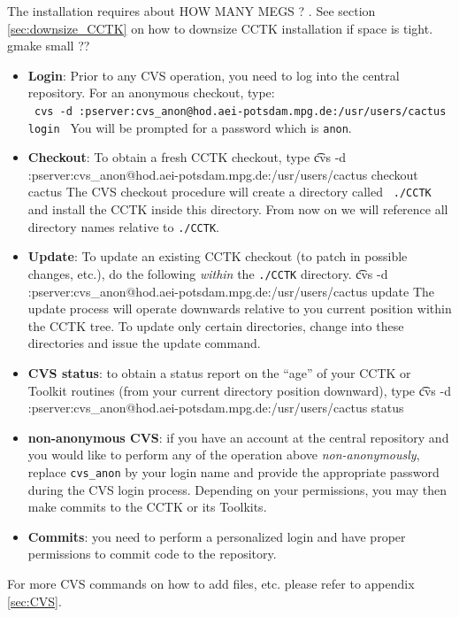 The installation requires about {\q HOW MANY MEGS ? }. See section
\ref{sec:downsize_CCTK} on how to downsize CCTK installation if space is tight.
{\q gmake small ??}

\begin{itemize}
\item{\bf Login}: Prior to any CVS operation, you need to log into the central
  repository. For an anonymous checkout, type:\\
  {\tt
    cvs -d :pserver:cvs\_anon@hod.aei-potsdam.mpg.de:/usr/users/cactus login
    }
  You will be prompted for a password which is {\tt anon}. 
\item{\bf Checkout}: To obtain a fresh CCTK checkout, type
  {\t
    cvs -d :pserver:cvs\_anon@hod.aei-potsdam.mpg.de:/usr/users/cactus checkout cactus
    }
  The CVS checkout procedure will create a directory called {\tt
    ./CCTK} and install the CCTK inside this directory.  From now on we
  will reference all directory names relative to {\tt ./CCTK}. 
  
\item{\bf Update}: To update an existing CCTK checkout (to patch in
  possible changes, etc.), do the following {\em within} the {\tt ./CCTK} directory.
  {\t
    cvs -d :pserver:cvs\_anon@hod.aei-potsdam.mpg.de:/usr/users/cactus update
    }
  The update process will operate downwards relative to you current position
  within the CCTK tree. To update only certain directories, change
  into these directories and issue the update command.
\item{\bf CVS status}: to obtain a status report on the ``age'' of your
  CCTK or Toolkit routines (from your current directory position
  downward), type
  {\t
    cvs -d :pserver:cvs\_anon@hod.aei-potsdam.mpg.de:/usr/users/cactus status
    }
\item{\bf non-anonymous CVS}: if you have an account at the central
  repository and you would like to perform any of the operation above
  {\em non-anonymously}, replace {\tt cvs\_anon} by your login name
  and provide the appropriate password during the CVS login
  process. Depending on your permissions, you may then make commits to the CCTK
  or its Toolkits.
\item{\bf Commits}: you need to perform a personalized login and have
  proper permissions to commit code to the repository. 
\end{itemize}
For more CVS commands on how to add files, etc. please refer to appendix \ref{sec:CVS}.



